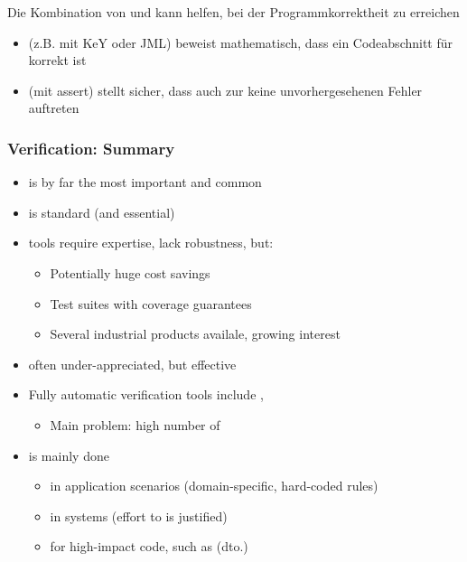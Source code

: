 \begin{infoBox}[title=Kombination von Statischer und Dynamischer Verifikation]
    Die Kombination von  und  kann helfen,  bei der Programmkorrektheit zu erreichen
    \begin{itemize}
        \item {} (z.B. mit KeY oder JML) beweist mathematisch, dass ein Codeabschnitt für  korrekt ist
        \item {} (mit assert) stellt sicher, dass auch zur  keine unvorhergesehenen Fehler auftreten
    \end{itemize}
\end{infoBox}
\subsubsection*{Verification: Summary}
\begin{itemize}
    \item {} is by far the most important and common 
    \item {} is standard (and essential)
    \item {} tools require expertise, lack robustness, but:
    \begin{itemize}
        \item Potentially huge cost savings
        \item Test suites with coverage guarantees
        \item Several industrial products availale, growing interest
    \end{itemize}
    \item {} often under-appreciated, but effective
    \item Fully automatic verification tools include , 
    \begin{itemize}
        \item Main problem: high number of 
    \end{itemize}
    \item {} is mainly done
    \begin{itemize}
        \item in  application scenarios (domain-specific, hard-coded rules)
        \item in  systems (effort to  is justified)
        \item for high-impact code, such as  (dto.)
    \end{itemize}
\end{itemize}